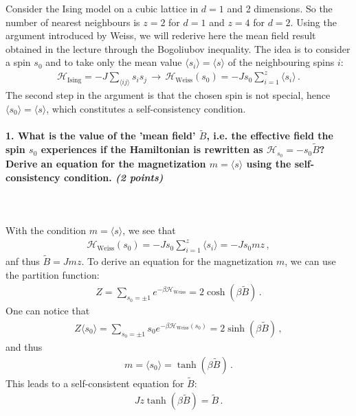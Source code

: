 Consider the Ising model on a cubic lattice in $d = 1$ and 2 dimensions. So the number of nearest
neighbours is $z = 2$ for $d = 1$ and $z = 4$ for $d = 2$. Using the argument introduced by Weiss, we will
rederive here the mean field result obtained in the lecture through the Bogoliubov inequality. The idea
is to consider a spin $s_0$ and to take only the mean value $\langle s_i \rangle = \langle s \rangle$ 
of the neighbouring spins $i$:
\begin{align}
	\mathcal{H}_{\text{Ising}}=-J\sum_{\langle ij\rangle} s_i s_j 
	\, \rightarrow \,
	\mathcal{H}_{\text{Weiss}}(s_0)=-J s_0\sum_{i=1}^z \langle s_i \rangle \,.
\end{align}
The second step in the argument is that the chosen spin is not special, hence 
$\langle s_0 \rangle = \langle s \rangle$, which constitutes a self-consistency condition.

\paragraph{1. What is the value of the ’mean field’ $\tilde{B}$, i.e. the effective field the spin $s_0$ experiences if the
Hamiltonian is rewritten as $\mathcal{H}_{s_0}=-s_0\tilde{B}$? Derive an equation for the magnetization 
$m = \langle s \rangle$ using the self-consistency condition. \textit{(2 points)}
} \ \\
\\
With the condition $m = \langle s \rangle$, we see that 
\begin{align}
	\mathcal{H}_{\text{Weiss}}(s_0)=-J s_0\sum_{i=1}^z \langle s_i \rangle
	= -J s_0 m z \,, 
\end{align}
anf thus $\tilde{B} = J m z$. To derive an equation for the magnetization $m$, we can use the partition function:
\begin{align}
	Z = \sum_{s_0=\pm 1} e^{-\beta\mathcal{H}_{\text{Weiss}}} = 2\cosh(\beta\tilde{B}) \,.
\end{align}
One can notice that 
\begin{align}
	Z \langle s_0 \rangle = \sum_{s_0=\pm 1} s_0 e^{-\beta\mathcal{H}_{\text{Weiss}}(s_0)} = 2\sinh(\beta\tilde{B}) \,,
\end{align}
and thus
\begin{align}
	m = \langle s_0 \rangle = \tanh(\beta\tilde{B}) \,.
\end{align}
This leads to a self-consistent equation for $\tilde{B}$:
\begin{align}
	\label{m}
	J z \tanh(\beta\tilde{B}) = \tilde{B} \,.
\end{align}


